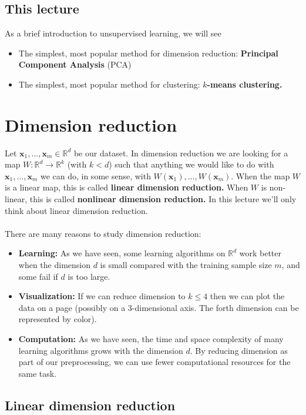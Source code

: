 \documentclass[11pt]{article}
\newcommand{\R}{\ensuremath{\mathbb{R}}}
\newcommand{\V}[1]{\mathbf{#1}}
\begin{document}
\subsection{This lecture}

As a brief introduction to unsupervised learning, we will see 
\begin{itemize}
  \item The simplest, most
popular method for dimension reduction: {\bf Principal Component Analysis} 
(PCA)
\item The simplest, most popular method for clustering: {\bf $k$-means
  clustering.}
\end{itemize}


\section{Dimension reduction}

Let $\V{x}_1,\ldots,\V{x}_m\in\R^d$ be our dataset. 
In dimension reduction we are looking for a map $W:\R^d\to\R^k$ (with $k<d$)
such that anything we would like to do with $\V{x}_1,\ldots,\V{x}_m$
we can do, in some sense, with 
$W(\V{x}_1),\ldots,W(\V{x}_m)$. When the map $W$ is a linear map, this is
called {\bf linear dimension reduction.}
When $W$ is non-linear, this is called {\bf nonlinear dimension reduction.}
In this lecture we'll only think about linear dimension reduction.
\\~\\
There are many reasons to study dimension reduction:
\begin{itemize}
  \item {\bf Learning:} As we have seen, some learning algorithms on $\R^d$ 
    work better
    when the dimension $d$ is small compared with the training sample size $m$,
    and some fail if $d$ is too large.

  \item {\bf Visualization:} If we can reduce dimension to $k\leq 4$ then we can
    plot the data on a page (possibly on a 3-dimensional axis. The forth
    dimension can be represented by color).
  \item {\bf Computation:}
    As we have seen, the time and space complexity of many learning algorithms
    grows with the dimension $d$. By reducing dimension as part of our
    preprocessing, we can use fewer computational resources for the same task.
\end{itemize}

\subsection{Linear dimension reduction}
\end{document}
